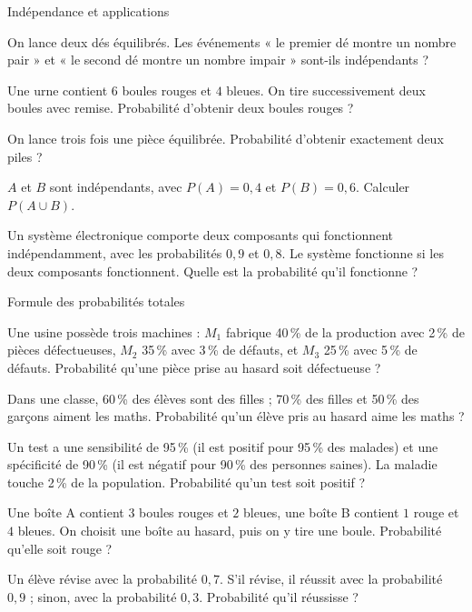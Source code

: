 \begin{exercice}[2]{Indépendance et applications}
\begin{questions}
  \item On lance deux dés équilibrés. Les événements « le premier dé montre un nombre pair » et « le second dé montre un nombre
    impair » sont-ils indépendants ?
  \item Une urne contient $6$ boules rouges et $4$ bleues. On tire successivement deux boules avec remise. Probabilité d'obtenir
    deux boules rouges ?
  \item On lance trois fois une pièce équilibrée. Probabilité d'obtenir exactement deux piles ?
  \item $A$ et $B$ sont indépendants, avec $P(A)=0{,}4$ et $P(B)=0{,}6$. Calculer $P(A\cup B)$.
  \item Un système électronique comporte deux composants qui fonctionnent indépendamment, avec les probabilités $0{,}9$ et $0{,}8$.
    Le système fonctionne si les deux composants fonctionnent. Quelle est la probabilité qu'il fonctionne ?
\end{questions}
\end{exercice}

\begin{exercice}[2]{Formule des probabilités totales}
\begin{questions}
  \item Une usine possède trois machines : $M_1$ fabrique 40\,\% de la production avec 2\,\% de pièces défectueuses, $M_2$ 35\,\%
    avec 3\,\% de défauts, et $M_3$ 25\,\% avec 5\,\% de défauts. Probabilité qu'une pièce prise au hasard soit défectueuse ?
  \item Dans une classe, 60\,\% des élèves sont des filles ; 70\,\% des filles et 50\,\% des garçons aiment les maths. Probabilité
    qu'un élève pris au hasard aime les maths ?
  \item Un test a une sensibilité de 95\,\% (il est positif pour 95\,\% des malades) et une spécificité de 90\,\% (il est négatif
    pour 90\,\% des personnes saines). La maladie touche 2\,\% de la population. Probabilité qu'un test soit positif ?
  \item Une boîte A contient $3$ boules rouges et $2$ bleues, une boîte B contient $1$ rouge et $4$ bleues. On choisit une boîte
    au hasard, puis on y tire une boule. Probabilité qu'elle soit rouge ?
  \item Un élève révise avec la probabilité $0{,}7$. S'il révise, il réussit avec la probabilité $0{,}9$ ; sinon, avec la
    probabilité $0{,}3$. Probabilité qu'il réussisse ?
\end{questions}
\end{exercice}

